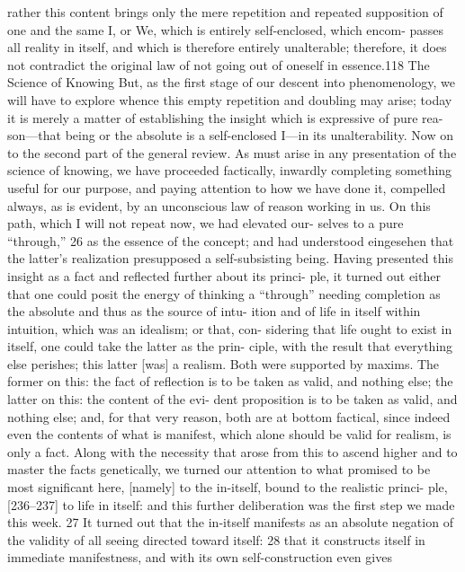 rather this content brings only the mere repetition and repeated supposition
of one and the same I, or We, which is entirely self-enclosed, which encom-
passes all reality in itself, and which is therefore entirely unalterable; therefore,
it does not contradict the original law of not going out of oneself in essence.118
The Science of Knowing
But, as the first stage of our descent into phenomenology, we will have to
explore whence this empty repetition and doubling may arise; today it is
merely a matter of establishing the insight which is expressive of pure rea-
son—that being or the absolute is a self-enclosed I—in its unalterability.
Now on to the second part of the general review. As must arise in any
presentation of the science of knowing, we have proceeded factically, inwardly
completing something useful for our purpose, and paying attention to how we
have done it, compelled always, as is evident, by an unconscious law of reason
working in us. On this path, which I will not repeat now, we had elevated our-
selves to a pure “through,” 26 as the essence of the concept; and had understood
{eingesehen} that the latter’s realization presupposed a self-subsisting being.
Having presented this insight as a fact and reflected further about its princi-
ple, it turned out either that one could posit the energy of thinking a
“through” needing completion as the absolute and thus as the source of intu-
ition and of life in itself within intuition, which was an idealism; or that, con-
sidering that life ought to exist in itself, one could take the latter as the prin-
ciple, with the result that everything else perishes; this latter [was] a realism.
Both were supported by maxims. The former on this: the fact of reflection is
to be taken as valid, and nothing else; the latter on this: the content of the evi-
dent proposition is to be taken as valid, and nothing else; and, for that very
reason, both are at bottom factical, since indeed even the contents of what is
manifest, which alone should be valid for realism, is only a fact.
Along with the necessity that arose from this to ascend higher and to
master the facts genetically, we turned our attention to what promised to be
most significant here, [namely] to the in-itself, bound to the realistic princi-
ple, [236–237] to life in itself: and this further deliberation was the first step
we made this week. 27 It turned out that the in-itself manifests as an absolute
negation of the validity of all seeing directed toward itself: 28 that it constructs
itself in immediate manifestness, and with its own self-construction even gives

